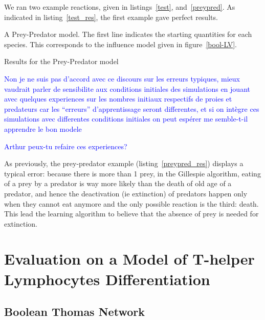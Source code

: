 \documentclass{llncs}
\newcommand{\francois}[1]{\textcolor{blue}{#1}}
\begin{document}
We ran two example reactions, given in listings~\ref{test}, and~\ref{preypred}. As indicated in listing~\ref{test_res}, the first example gave perfect results.

\begin{listfig}[hp]
	
	\vspace{-1em}
	\caption{A Prey-Predator model. The first line indicates the starting quantities for each species. This corresponds to the influence model given in figure~\ref{bool-LV}.\label{preypred}}
\end{listfig}
\begin{listfig}[hp]
	
	\vspace{-1em}
	\caption{Results for the Prey-Predator model\label{preypred_res}}
\end{listfig}

\francois{Non je ne suis pas d'accord avec ce discours sur les erreurs typiques,
mieux vaudrait parler de sensibilite aux conditions initiales des simulations
en jouant avec quelques experiences sur les nombres initiaux respectifs de proies et predateurs
car les ``erreurs'' d'apprentissage seront differentes,
et si on intègre ces simulations avec differentes conditions initiales on peut espérer me semble-t-il apprendre le bon modele}

\francois{Arthur peux-tu refaire ces experiences?}

As previously, the prey-predator example (listing~\ref{preypred_res}) displays a typical error: because there is more than 1 prey, in the Gillespie algorithm, eating of a prey by a predator is way more likely than the death of old age of a predator, and hence the deactivation (ie extinction) of predators happen only when they cannot eat anymore and the only possible reaction is the third: death. This lead the learning algorithm to believe that the absence of prey is needed for extinction.


\section{Evaluation on a Model of T-helper Lymphocytes Differentiation}\label{ex:lympho}


\subsection{Boolean Thomas Network}
\end{document}
